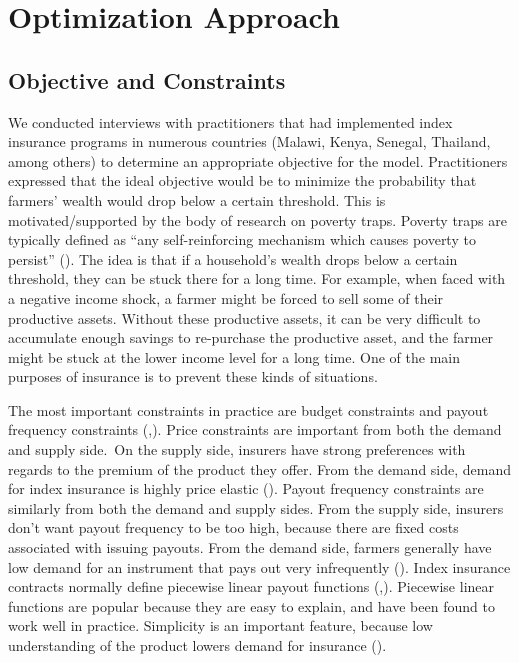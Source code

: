 \documentclass[11pt]{article}
\begin{document}
\section{Optimization Approach}
  \subsection{Objective and Constraints}
    We conducted interviews with practitioners that had implemented index insurance programs in numerous countries (Malawi, Kenya, Senegal, Thailand, among others) to determine an appropriate objective for the model. Practitioners expressed that the ideal objective would be to minimize the probability that farmers' wealth would drop below a certain threshold. This is motivated/supported by the body of research on poverty traps. Poverty traps are typically defined as ``any self-reinforcing mechanism which causes poverty to persist'' (\cite{azariadis2005poverty}). The idea is that if a household's wealth drops below a certain threshold, they can be stuck there for a long time. For example, when faced with a negative income shock, a farmer might be forced to sell some of their productive assets. Without these productive assets, it can be very difficult to accumulate enough savings to re-purchase the productive asset, and the farmer might be stuck at the lower income level for a long time. One of the main purposes of insurance is to prevent these kinds of situations.  
    
    The most important constraints in practice are budget constraints and payout frequency constraints (\cite{osgood2007designing},\cite{world2011weather}). Price constraints are important from both the demand and supply side. On the supply side, insurers have strong preferences with regards to the premium of the product they offer. From the demand side, demand for index insurance is highly price elastic (\cite{jensen2017agricultural}). Payout frequency constraints are similarly from both the demand and supply sides. From the supply side, insurers don't want payout frequency to be too high, because there are fixed costs associated with issuing payouts. From the demand side, farmers generally have low demand for an instrument that pays out very infrequently (\cite{osgood2007designing}). Index insurance contracts normally define piecewise linear payout functions (\cite{world2011weather},\cite{chantarat2013designing}). Piecewise linear functions are popular because they are easy to explain, and have been found to work well in practice. Simplicity is an important feature, because low understanding of the product lowers demand for insurance (\cite{cai2020subsidy}).
\end{document}
